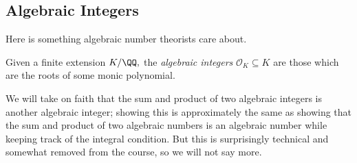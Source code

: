 \subsection{Algebraic Integers}
Here is something algebraic number theorists care about.
\begin{definition}
	Given a finite extension $K/\QQ,$ the \textit{algebraic integers} $\mathcal O_K\subseteq K$ are those which are the roots of some monic polynomial.
\end{definition}
We will take on faith that the sum and product of two algebraic integers is another algebraic integer; showing this is approximately the same as showing that the sum and product of two algebraic numbers is an algebraic number while keeping track of the integral condition. But this is surprisingly technical and somewhat removed from the course, so we will not say more.

